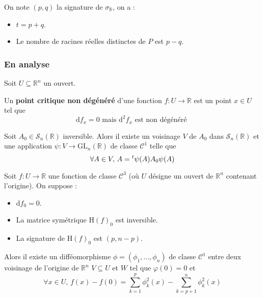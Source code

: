 
	\begin{theorem}
		On note $(p,q)$ la signature de $\sigma_{\mathbb{R}}$, on a :
		\begin{itemize}
			\item $t = p + q$.
			\item Le nombre de racines réelles distinctes de $P$ est $p-q$.
		\end{itemize}
	\end{theorem}

	\subsubsection{En analyse}

	Soit $U \subseteq \mathbb{R}^n$ un ouvert.


	\begin{definition}
		Un \textbf{point critique non dégénéré} d'une fonction $f : U \rightarrow \mathbb{R}$ est un point $x \in U$ tel que
		\[ \mathrm{d}f_x = 0 \text{ mais } \mathrm{d}^2f_x \text{ est non dégénéré } \]
	\end{definition}


	\begin{lemma}
		Soit $A_0 \in \mathcal{S}_n(\mathbb{R})$ inversible. Alors il existe un voisinage $V$ de $A_0$ dans $\mathcal{S}_n(\mathbb{R})$ et une application $\psi : V \rightarrow \mathrm{GL}_n(\mathbb{R})$ de classe $\mathcal{C}^1$ telle que
		\[ \forall A \in V, \, A = \mathstrut ^t \psi(A) A_0 \psi(A) \]
	\end{lemma}


	\begin{lemma}[Morse]
		Soit $f : U \rightarrow \mathbb{R}$ une fonction de classe $\mathcal{C}^3$ (où $U$ désigne un ouvert de $\mathbb{R}^n$ contenant l'origine). On suppose :
		\begin{itemize}
			\item $\mathrm{d} f_0 = 0$.
			\item La matrice symétrique $\mathrm{H} (f)_0$ est inversible.
			\item La signature de $\mathrm{H}(f)_0$ est $(p, n-p)$.
		\end{itemize}
		Alors il existe un difféomorphisme $\phi = (\phi_1, \dots, \phi_n)$ de classe $\mathcal{C}^1$ entre deux voisinage de l'origine de $\mathbb{R}^n$ $V \subseteq U$ et $W$ tel que $\varphi(0) = 0$ et
		\[ \forall x \in U, \, f(x) - f(0) = \sum_{k=1}^p \phi_k^2(x) - \sum_{k=p+1}^n \phi_k^2(x) \]
	\end{lemma}

